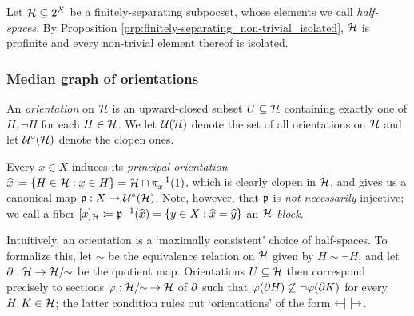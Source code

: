 \documentclass{amsart}
\begin{document}
    Let $\mathcal{H}\subseteq2^X$ be a finitely-separating subpocset, whose elements we call \textit{half-spaces}. By Proposition \ref{prp:finitely-separating_non-trivial_isolated}, $\mathcal{H}$ is profinite and every non-trivial element thereof is isolated.
    
    \subsubsection{Median graph of orientations}

    \begin{definition}\label{def:orientation}
        An \textit{orientation} on $\mathcal{H}$ is an upward-closed subset $U\subseteq\mathcal{H}$ containing exactly one of $H,\lnot H$ for each $H\in\mathcal{H}$. We let $\mathcal{U}(\mathcal{H})$ denote the set of all orientations on $\mathcal{H}$ and let $\mathcal{U}^\circ(\mathcal{H})$ denote the clopen ones.
    \end{definition}

    {}

    \begin{example}
        Every $x\in X$ induces its \textit{principal orientation} $\widehat{x}\coloneqq\left\{H\in\mathcal{H}: x\in H\right\}=\mathcal{H}\cap\pi^{-1}_x(1)$, which is clearly clopen in $\mathcal{H}$, and gives us a canonical map $\mathfrak{p}:X\to\mathcal{U}^\circ(\mathcal{H})$. Note, however, that $\mathfrak{p}$ is \textit{not necessarily} injective; we call a fiber $[x]_{\mathcal{H}}\coloneqq\mathfrak{p}^{-1}(\widehat{x})=\left\{y\in X:\widehat{x}=\widehat{y}\right\}$ an \textit{$\mathcal{H}$-block}.
    \end{example}

    \begin{remark}
        Intuitively, an orientation is a `maximally consistent' choice of half-spaces. To formalize this, let $\sim$ be the equivalence relation on $\mathcal{H}$ given by $H\sim\lnot H$, and let $\partial:\mathcal{H}\to\mathcal{H}/\!\!\sim$ be the quotient map. Orientations $U\subseteq\mathcal{H}$ then correspond precisely to sections $\varphi:\mathcal{H}/\!\!\sim\,\to\mathcal{H}$ of $\partial$ such that $\varphi(\partial H)\not\subseteq\lnot\varphi(\partial K)$ for every $H,K\in\mathcal{H}$; the latter condition rules out `orientations' of the form $\leftarrow\hspace{-4.7pt}|\,\,|\hspace{-4.7pt}\rightarrow$.
    \end{remark}
\end{document}
